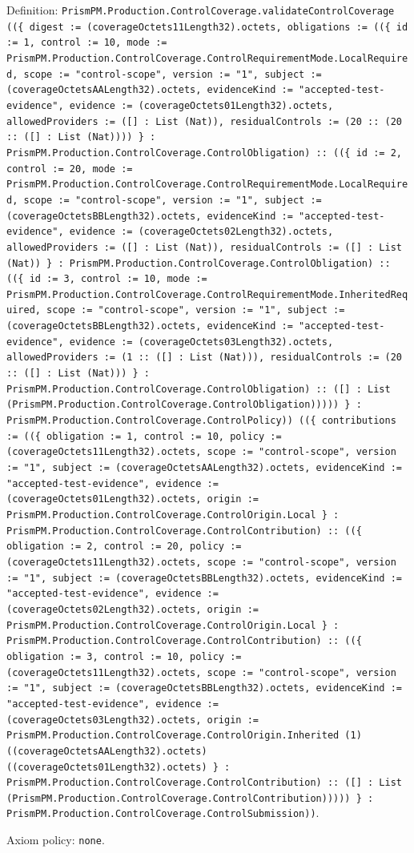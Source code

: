 \documentclass[11pt]{article}
\begin{document}
\noindent Definition: \texttt{PrismPM.Production.ControlCoverage.validateControlCoverage ((\{ digest := (coverageOctets11Length32).octets, obligations := ((\{ id := 1, control := 10, mode := PrismPM.Production.ControlCoverage.ControlRequirementMode.LocalRequired, scope := "control-scope", version := "1", subject := (coverageOctetsAALength32).octets, evidenceKind := "accepted-test-evidence", evidence := (coverageOctets01Length32).octets, allowedProviders := ([] : List (Nat)), residualControls := (20 :: (20 :: ([] : List (Nat)))) \} : PrismPM.Production.ControlCoverage.ControlObligation) :: ((\{ id := 2, control := 20, mode := PrismPM.Production.ControlCoverage.ControlRequirementMode.LocalRequired, scope := "control-scope", version := "1", subject := (coverageOctetsBBLength32).octets, evidenceKind := "accepted-test-evidence", evidence := (coverageOctets02Length32).octets, allowedProviders := ([] : List (Nat)), residualControls := ([] : List (Nat)) \} : PrismPM.Production.ControlCoverage.ControlObligation) :: ((\{ id := 3, control := 10, mode := PrismPM.Production.ControlCoverage.ControlRequirementMode.InheritedRequired, scope := "control-scope", version := "1", subject := (coverageOctetsBBLength32).octets, evidenceKind := "accepted-test-evidence", evidence := (coverageOctets03Length32).octets, allowedProviders := (1 :: ([] : List (Nat))), residualControls := (20 :: ([] : List (Nat))) \} : PrismPM.Production.ControlCoverage.ControlObligation) :: ([] : List (PrismPM.Production.ControlCoverage.ControlObligation))))) \} : PrismPM.Production.ControlCoverage.ControlPolicy)) ((\{ contributions := ((\{ obligation := 1, control := 10, policy := (coverageOctets11Length32).octets, scope := "control-scope", version := "1", subject := (coverageOctetsAALength32).octets, evidenceKind := "accepted-test-evidence", evidence := (coverageOctets01Length32).octets, origin := PrismPM.Production.ControlCoverage.ControlOrigin.Local \} : PrismPM.Production.ControlCoverage.ControlContribution) :: ((\{ obligation := 2, control := 20, policy := (coverageOctets11Length32).octets, scope := "control-scope", version := "1", subject := (coverageOctetsBBLength32).octets, evidenceKind := "accepted-test-evidence", evidence := (coverageOctets02Length32).octets, origin := PrismPM.Production.ControlCoverage.ControlOrigin.Local \} : PrismPM.Production.ControlCoverage.ControlContribution) :: ((\{ obligation := 3, control := 10, policy := (coverageOctets11Length32).octets, scope := "control-scope", version := "1", subject := (coverageOctetsBBLength32).octets, evidenceKind := "accepted-test-evidence", evidence := (coverageOctets03Length32).octets, origin := PrismPM.Production.ControlCoverage.ControlOrigin.Inherited (1) ((coverageOctetsAALength32).octets) ((coverageOctets01Length32).octets) \} : PrismPM.Production.ControlCoverage.ControlContribution) :: ([] : List (PrismPM.Production.ControlCoverage.ControlContribution))))) \} : PrismPM.Production.ControlCoverage.ControlSubmission))}.\par
\noindent Axiom policy: \texttt{none}.\par
\end{document}
